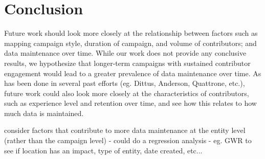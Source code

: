 \chapter{Conclusion}
\label{chapterlabel7}

Future work should look more closely at the relationship between factors such as mapping campaign style, duration of campaign, and volume of contributors; and data maintenance over time. While our work does not provide any conclusive results, we hypothesize that longer-term campaigns with sustained contributor engagement would lead to a greater prevalence of data maintenance over time. As has been done in several past efforts (eg. Dittus, Anderson, Quattrone, etc.), future work could also look more closely at the characteristics of contributors, such as experience level and retention over time, and see how this relates to how much data is maintained. 

consider factors that contribute to more data maintenance at the entity level (rather than the campaign level) - could do a regression analysis - eg. GWR to see if location has an impact, type of entity, date created, etc...
